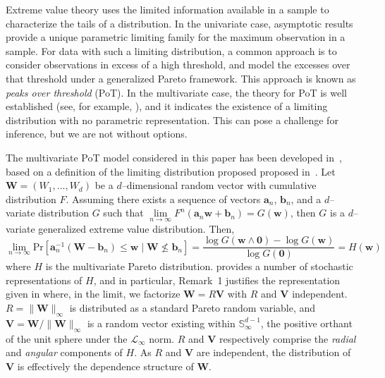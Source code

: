 Extreme value theory uses the limited information available in a sample to
    characterize the tails of a distribution.  In the univariate case, asymptotic
    results provide a unique parametric limiting family for the maximum observation
    in a sample.  For data with such a limiting distribution, a common approach
    is to consider observations in excess of a high threshold, and model the
    excesses over that threshold under a generalized Pareto framework.  This
    approach is known as \emph{peaks over threshold} (PoT).  In the multivariate 
    case, the theory for PoT is well established (see, for example, 
    \cite{dehaan2006}), and it indicates the existence of a limiting distribution
    with no parametric representation.  This can pose a challenge for inference,
    but we are not without options.

The multivariate PoT model considered in this paper has been developed 
    in~\cite{trubey:pg}, based on a definition of the limiting distribution proposed
    proposed in~\cite{rootzen2018}.  
    Let $\bm{W} = (W_1,\ldots,W_d)$ be a $d$--dimensional random vector with 
    cumulative distribution $F$.  Assuming there exists a sequence of vectors
    $\bm{a}_n$, $\bm{b}_n$, and a $d$--variate distribution $G$ such that 
    $\lim\limits_{n\to\infty}F^n(\bm{a}_n\bm{w} + \bm{b}_n) = G(\bm{w})$, then
    $G$ is a $d$--variate generalized extreme value distribution.  Then,
    \begin{equation}
        \label{eqn:threshold}
        \lim\limits_{n\to\infty}\text{Pr}
            \left[\bm{a}_n^{-1}(\bm{W} - \bm{b}_n) 
                \leq \bm{w}\mid \bm{W}\not\leq \bm{b}_n\right]
        = \frac{\log G(\bm{w}\wedge \bm{0}) - \log G(\bm{w})}{\log G(\bm{0})}
        = H(\bm{w})
    \end{equation}
    where $H$ is the multivariate Pareto distribution.  \cite{rootzen2018}
    provides a number of stochastic representations of $H$, and in particular,
    Remark~1 justifies the representation given in \cite{ferreira2014} where,
    in the limit, we factorize $\bm{W} = R\bm{V}$ with $R$ and $\bm{V}$ independent.
    $R = \lVert \bm{W}\rVert_{\infty}$ is distributed as a standard Pareto random
    variable, and $\bm{V} = \bm{W} / \lVert \bm{W}\rVert_{\infty}$ is a random
    vector existing within $\mathbb{S}_{\infty}^{d-1}$, the positive orthant of
    the unit sphere under the $\mathcal{L}_{\infty}$ norm.  $R$ and $\bm{V}$
    respectively comprise the \emph{radial} and \emph{angular} components of $H$.
    As $R$ and $\bm{V}$ are independent,  the distribution of $\bm{V}$ is 
    effectively the dependence structure of $\bm{W}$.

